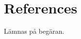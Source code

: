 \documentclass[11pt,a4paper,sans]{moderncv}
\begin{document}

\section{References}
Lämnas på begäran.




% 

\clearpage
\Large
\end{document}
